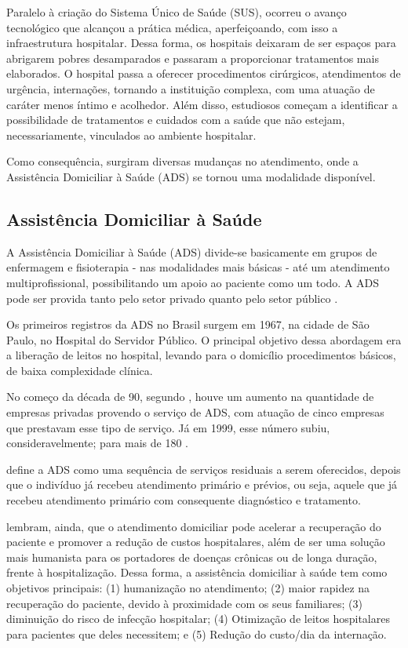 Paralelo à criação do Sistema Único de Saúde (SUS), ocorreu o avanço
tecnológico que alcançou a prática médica, aperfeiçoando, com isso a
infraestrutura hospitalar. Dessa forma, os hospitais deixaram de ser espaços
para abrigarem pobres desamparados e passaram a proporcionar tratamentos mais
elaborados. O hospital passa a oferecer  procedimentos cirúrgicos, atendimentos
de urgência, internações, tornando a instituição complexa, com uma atuação de
caráter menos íntimo e acolhedor. Além disso, estudiosos começam a identificar
a possibilidade de tratamentos e cuidados com a  saúde que não estejam,
necessariamente, vinculados ao ambiente hospitalar.

Como consequência, surgiram diversas mudanças no atendimento, onde a Assistência
Domiciliar à Saúde (ADS) se tornou uma modalidade disponível.

\subsection{Assistência Domiciliar à Saúde}
\label{subsec:assistencia-domiciliar-a-saude}

A Assistência Domiciliar à Saúde (ADS) divide-se basicamente em grupos de
enfermagem e fisioterapia - nas modalidades mais básicas - até um atendimento
multiprofissional, possibilitando um apoio ao paciente como um todo. A ADS pode
ser provida tanto pelo setor privado quanto pelo setor público
\cite{amaral2001assistencia}.

Os primeiros registros da ADS no Brasil surgem em 1967, na cidade de São
Paulo, no Hospital do Servidor Público. O principal objetivo dessa abordagem
era a liberação de leitos no hospital, levando para o domicílio procedimentos
básicos, de baixa complexidade clínica.

No começo da década de 90, segundo ,
houve um aumento na quantidade de empresas privadas provendo o serviço de ADS,
com atuação de cinco empresas que prestavam esse tipo de  serviço. Já em 1999,
esse número subiu, consideravelmente; para mais de 180
\cite{tavolari2000desenvolvimento}.

 define a ADS como uma sequência de serviços
residuais a serem oferecidos, depois que o indivíduo já recebeu atendimento
primário e prévios, ou seja, aquele que já recebeu atendimento primário com
consequente diagnóstico e tratamento.

 lembram, ainda, que o atendimento domiciliar
pode acelerar a recuperação do  paciente e promover a redução de custos
hospitalares, além de ser uma solução mais  humanista para os portadores de
doenças crônicas ou de longa duração, frente à  hospitalização. Dessa forma, a
assistência domiciliar à saúde tem como objetivos principais: (1) humanização
no atendimento; (2) maior rapidez na recuperação do paciente, devido à
proximidade com os seus familiares; (3) diminuição do risco de infecção
hospitalar; (4) Otimização de leitos hospitalares para pacientes que deles
necessitem; e (5) Redução do custo/dia da internação.

